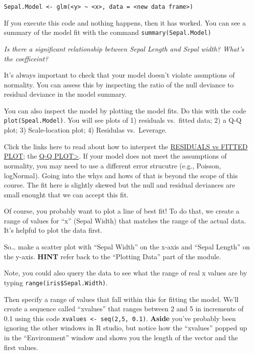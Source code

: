\documentclass[]{book}
\begin{document}
\texttt{Sepal.Model\ \textless{}-\ glm(\textless{}y\textgreater{}\ \textasciitilde{}\ \textless{}x\textgreater{},\ data\ =\ \textless{}new\ data\ frame\textgreater{})}

If you execute this code and nothing happens, then it has worked. You
can see a summary of the model fit with the command
\texttt{summary(Sepal.Model)}

\emph{Is there a significant relationship between Sepal Length and Sepal
width? What's the coefficeint?}

It's always important to check that your model doesn't violate
assmptions of normality. You can assess this by inspecting the ratio of
the null deviance to residual deviance in the model summary.

You can also inspect the model by plotting the model fits. Do this with
the code \texttt{plot(Speal.Model)}. You will see plots of 1) residuals
vs.~fitted data; 2) a Q-Q plot; 3) Scale-location plot; 4) Residulas
vs.~Leverage.

Click the links here to read about how to interpret the
\href{https://stats.stackexchange.com/questions/76226/interpreting-the-residuals-vs-fitted-values-plot-for-verifying-the-assumptions}{RESIDUALS
vs FITTED PLOT}; the
\href{https://stats.stackexchange.com/questions/101274/how-to-interpret-a-qq-plot}{Q-Q
PLOT\textgreater{}}. If your model does not meet the assumptions of
normality, you may need to use a different error strucutre (e.g.,
Poisson, logNormal). Going into the whys and hows of that is beyond the
scope of this course. The fit here is slightly skewed but the null and
residual deviances are small enought that we can accept this fit.

Of course, you probably want to plot a line of best fit! To do that, we
create a range of values for ``x'' (Sepal Width) that matches the range
of the actual data. It's helpful to plot the data first.

So\ldots{} make a scatter plot with ``Sepal Width'' on the x-axis and
``Sepal Length'' on the y-axis. \textbf{HINT} refer back to the
``Plotting Data'' part of the module.

Note, you could also query the data to see what the range of real x
values are by typing \texttt{range(iris\$Sepal.Width)}.

Then specify a range of values that fall within this for fitting the
model. We'll create a sequence called ``xvalues'' that ranges between 2
and 5 in increments of 0.1 using this code
\texttt{xvalues\ \textless{}-\ seq(2,5,\ 0.1)}. \textbf{Aside} you've
probably been ignoring the other windows in R studio, but notice how the
``xvalues'' popped up in the ``Environment'' window and shows you the
length of the vector and the first values.
\end{document}
